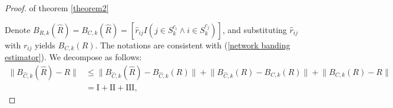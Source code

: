 \begin{proof}{of theorem \ref{theorem2}}

Denote $B_{R, k}(\hat R) = B_{C, k}(\hat R) = [\hat r_{ij} I(j\in S_{k}^{c_i} \land i\in S_{k}^{c_j})]$, and substituting $\hat r_{ij}$ with $r_{ij}$ yields $B_{C, k}(R)$. The notations are consistent with (\ref{network banding estimator}). We decompose as follows: 
\begin{equation}
	\begin{split}
        \lVert B_{\hat{C}, k}(\hat R) - R \rVert &\leq 
            \lVert B_{\hat{C}, k}(\hat R) - B_{\hat{C}, k}(R) \rVert + 
        	\lVert  B_{\hat{C}, k}(R) - B_{C, k}(R) \rVert + 
            \lVert B_{C, k}(R) - R \rVert \\
        &= \mathrm{I} + \mathrm{II} + \mathrm{III},
    \end{split} 
    \label{decompose}
\end{equation}
    

\end{proof}
